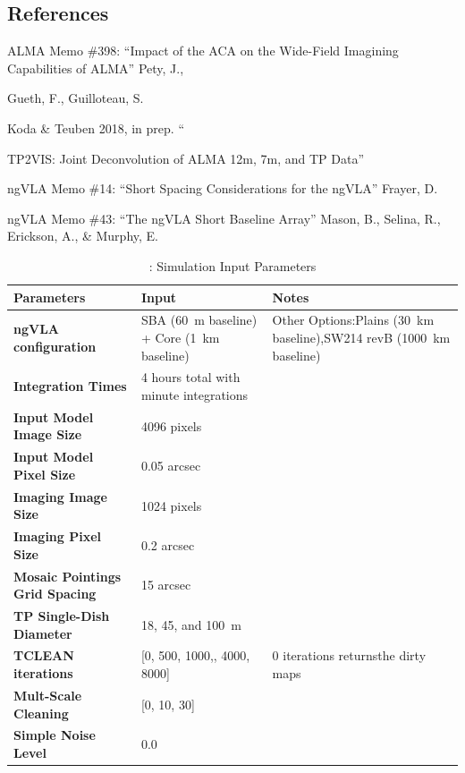 \documentclass[12pt]{article}
\begin{document}
\subsection*{References}
{\footnotesize
ALMA Memo \#398: ``Impact of the ACA on the Wide-Field Imagining Capabilities of ALMA''  Pety, J., 

Gueth, F., Guilloteau, S.

\noindent Koda \& Teuben 2018, in prep. ``{TP2VIS: Joint Deconvolution of ALMA 12m, 7m, and TP Data''

\noindent ngVLA Memo \#14: ``Short Spacing Considerations for the ngVLA'' Frayer, D.

\noindent ngVLA Memo \#43: ``The ngVLA Short Baseline Array'' Mason, B., Selina, R., Erickson, A., \& Murphy, E.

}

\begin{table}
\centering
\caption{: Simulation Input Parameters}
\label{tab:param}
\def\arraystretch{1.25}
\begin{tabular}{@{} lp{25ex}p{30ex} @{}}\toprule\midrule
\textbf{Parameters} 					& Input  												& Notes \\\midrule
\textbf{ngVLA configuration} 			& SBA (\SI{60}{\meter} baseline) + \newline Core (\SI{1}{\kilo\meter} baseline) & Other Options:\newline Plains (\SI{30}{\kilo\meter} baseline),\newline SW214 revB (\SI{1000}{\kilo\meter} baseline)\\\midrule


\textbf{Integration Times} 				& 4 hours total with \newline1 minute integrations 		& \\\midrule
\textbf{Input Model Image Size} 		& 4096 pixels 											& \\\midrule
\textbf{Input Model Pixel Size} 		& 0.05 arcsec 											& \\\midrule
\textbf{Imaging Image Size} 			& 1024 pixels 											& \\\midrule
\textbf{Imaging Pixel Size} 			& 0.2 arcsec 											& \\\midrule
\textbf{Mosaic Pointings Grid Spacing} 	& 15 arcsec 											& \\\midrule
\textbf{TP Single-Dish Diameter} 		& 18, 45, and \SI{100}{\meter}							& \\\midrule
\textbf{TCLEAN iterations} 				& [0, 500, 1000,\newline 2000, 4000, 8000] 				& 0 iterations returns\newline the dirty maps \\\midrule
\textbf{Mult-Scale Cleaning} 			& [0, 10, 30] 											& \\\midrule
\textbf{Simple Noise Level} 			& 0.0 													& \\\bottomrule
\end{tabular}
\end{table}

}
\end{document}
